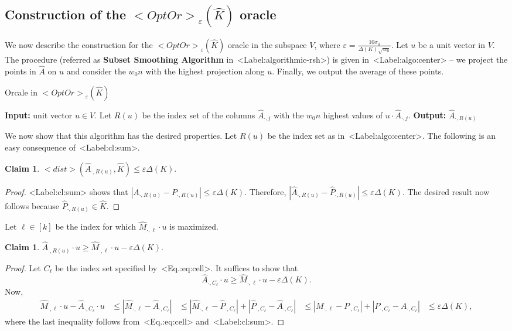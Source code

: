 \documentclass[11pt,letterpaper]{article}
\def\\{}%
\def\mathsf#1{<#1>}%
\def\Cref#1{<Label:#1>}%
\def\eqref#1{<Eq.:#1>}%
\newtheorem{claim}[theorem]{Claim}
\theoremstyle{definition}
\theoremstyle{remark}
\newcommand{\dst}{{\mathsf{dist}}}
\newcommand{\hatM}{{\widehat M}}
\newcommand{\hatA}{{\widehat A}}
\newcommand{\hatP}{{\widehat P}}
\newcommand{\hatK}{{\widehat K}}
\newcommand{\Mdot}[1]{{M_{\cdot, #1}}}
\newcommand{\hMdot}[1]{{\hatM_{\cdot, #1}}}
\newcommand{\Pdot}[1]{{P_{\cdot, #1}}}
\newcommand{\Adot}[1]{{A_{\cdot, #1}}}
\newcommand{\hAdot}[1]{{\hatA_{\cdot, #1}}}
\newcommand{\hPdot}[1]{{\hatP_{\cdot, #1}}}
\newcommand{\opto}{{\mathsf{OptOr}}}
\begin{document}
\subsection{Construction of the $\opto_\varepsilon(\hatK)$ oracle}

We now describe the construction for the   $\opto_\varepsilon(\hatK)$ oracle in the subspace $V$, where $\varepsilon = \frac{10 \sigma_0}{\Delta(K) \sqrt{w_0}}$. Let $u$ be a unit vector in $V$. The procedure (referred as {\bf Subset Smoothing Algorithm} in~\Cref{algorithmic-rsh}) is given in~\Cref{algo:center}  -- we project the points in $\hatA$ on $u$ and consider the  $w_0 n$ with the highest projection along $u$. Finally, we output the average of these points. 



\begin{algorithm}[H]
  \caption{Orcale in $\opto_\varepsilon(\hatK)$}
  \label{algo:center}
    {\bf Input:} unit vector $u \in V$. \;
       Let $R(u)$ be the index set of the columns $\hAdot{j}$ with the $w_0 n$ highest values of $u \cdot \hAdot{j}$. \;
      {\bf Output:} $\hAdot{R(u)}$ \;
\end{algorithm}


We now show that this algorithm has the desired properties. Let $R(u)$ be the index set as in~\Cref{algo:center}. The following is an easy consequence of~\Cref{cl:sum}. 
\begin{claim}
\label{cl:eps1}
    $\dst(\hAdot{R(u)}, \hatK) \leq \varepsilon\Delta(K) . $
\end{claim}
\begin{proof}
    \Cref{cl:sum} shows that $|\Adot{R(u)} - \Pdot{R(u)}| \leq \varepsilon\Delta(K) .$ Therefore, 
    $|\hAdot{R(u)} - \hPdot{R(u)}| \leq \varepsilon\Delta(K) $. The desired result now follows because
    $\hPdot{R(u)} \in \hatK.$
\end{proof}


Let $\ell \in [k]$ be the index for which $\hMdot{\ell} \cdot u$ is maximized. 
\begin{claim}
    \label{cl:eps2}
    $\hAdot{R(u)} \cdot u \geq \hMdot{\ell} \cdot u - \varepsilon\Delta(K) .$
\end{claim}
\begin{proof}
    Let $C_\ell$ be the index set specified by~\eqref{eq:cell}. It suffices to show that 
    $$ \hAdot{C_\ell} \cdot u \geq \hMdot{\ell} \cdot u - \varepsilon\Delta(K) .$$ 
    Now, 
    \begin{align*}
    \hMdot{\ell} \cdot u - \hAdot{C_\ell} \cdot u & \leq |\hMdot{\ell} - \hAdot{C_\ell}| \\
    & \leq |\hMdot{\ell} - \hPdot{C_\ell}| + |\hPdot{C_\ell} - \hAdot{C_\ell}| \\
    & \leq |\Mdot{\ell} - \Pdot{C_\ell}| + |\Pdot{C_\ell} - \Adot{C_\ell}| \\
    & \leq \varepsilon \Delta(K),
    \end{align*}
where the last inequality follows from~\eqref{eq:cell} and~\Cref{cl:sum}. 
\end{proof}
\end{document}
